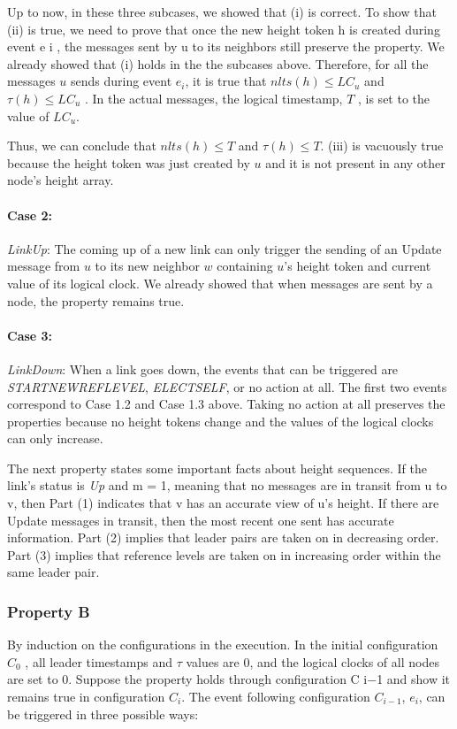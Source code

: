 \documentclass{article}
\begin{document}
Up to now, in these three subcases, we showed that (i) is correct. To show that (ii) is true, we need to prove that once the new height token h is created during event e i , the messages sent by u to its neighbors still preserve the property. We already showed that (i) holds in the the subcases above. Therefore, for all the messages $u$ sends during event $e_i$, it is true that $nlts(h) \leq LC_u$ and $τ (h) \leq LC_u$ . In the actual messages, the logical timestamp, $T$ , is set to the value of $LC_u$.

Thus, we can conclude that $nlts(h) \leq T$ and $\tau (h) \leq T$. (iii) is vacuously true because the height token was just created by $u$ and it is not present in any other node’s height array.
\paragraph{Case 2:}
\textit{LinkUp}: The coming up of a new link can only trigger the sending of an Update message from $u$ to its new neighbor $w$ containing $u$’s height token and current value of its logical clock. We already showed that when messages are sent by a node, the property remains true.
\paragraph{Case 3:}
\textit{LinkDown}: When a link goes down, the events that can be triggered are \textit{STARTNEWREFLEVEL}, \textit{ELECTSELF}, or no action at all. The first two events correspond to Case 1.2 and Case 1.3 above. Taking no action at all preserves the properties because no height tokens change and the values of the logical clocks can only increase.

The next property states some important facts about height sequences. If the link’s status is \textit{Up} and m = 1, meaning that no messages are in transit from u to v, then Part (1) indicates that v has an accurate view of u’s height. If there are Update messages in transit, then the most recent one sent has accurate information. Part (2) implies that leader pairs are taken on in decreasing order. Part (3) implies that reference levels are taken on in increasing order within the same leader pair.



\subsubsection{Property B}
By induction on the configurations in the execution.
In the initial configuration $C_0$ , all leader timestamps and $\tau $ values are 0, and the logical clocks of all nodes are set to 0. Suppose the property holds through configuration C i−1 and show it remains true in configuration $C_i$.
The event following configuration $C_{i − 1}$, $e_i$, can be triggered in three possible ways:
\end{document}
